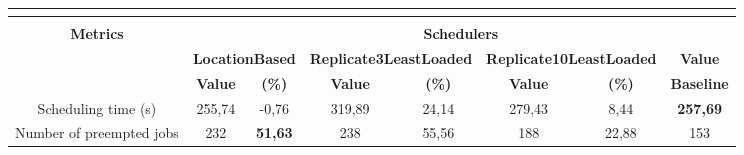 \begin{table}[]
\begin{tabular}{cccccccc}
\multicolumn{8}{l}{}                                                                                                                                                                                                                                                                                                                 \\ \hline
\multicolumn{8}{|c|}{\textbf{}}                                                                                                                                                                                                                                                                                                      \\ \hline
\multicolumn{1}{|c|}{\multirow{3}{*}{\textbf{Metrics}}} & \multicolumn{7}{c|}{\textbf{Schedulers}}                                                                                                                                                                                                                                   \\ \cline{2-8} 
\multicolumn{1}{|c|}{}                                  & \multicolumn{2}{c|}{\textbf{LocationBased}}                               & \multicolumn{2}{c|}{\textbf{Replicate3LeastLoaded}}                        & \multicolumn{2}{c|}{\textbf{Replicate10LeastLoaded}}                     & \multicolumn{1}{c|}{\textbf{Value}}    \\ \cline{2-8} 
\multicolumn{1}{|c|}{}                                  & \multicolumn{1}{c|}{\textbf{Value}} & \multicolumn{1}{c|}{\textbf{(\%)}}  & \multicolumn{1}{c|}{\textbf{Value}} & \multicolumn{1}{c|}{\textbf{(\%)}}   & \multicolumn{1}{c|}{\textbf{Value}} & \multicolumn{1}{c|}{\textbf{(\%)}} & \multicolumn{1}{c|}{\textbf{Baseline}} \\ \hline
\multicolumn{1}{|c|}{Scheduling time (s)}               & \multicolumn{1}{c|}{255,74}         & \multicolumn{1}{c|}{-0,76}          & \multicolumn{1}{c|}{319,89}         & \multicolumn{1}{c|}{24,14}           & \multicolumn{1}{c|}{279,43}         & \multicolumn{1}{c|}{8,44}          & \multicolumn{1}{c|}{\textbf{257,69}}   \\ \hline
\multicolumn{1}{|c|}{Number of preempted jobs}          & \multicolumn{1}{c|}{232}            & \multicolumn{1}{c|}{\textbf{51,63}} & \multicolumn{1}{c|}{238}            & \multicolumn{1}{c|}{55,56}           & \multicolumn{1}{c|}{188}            & \multicolumn{1}{c|}{22,88}         & \multicolumn{1}{c|}{153}               \\ \hline

\end{tabular}
\end{table}
